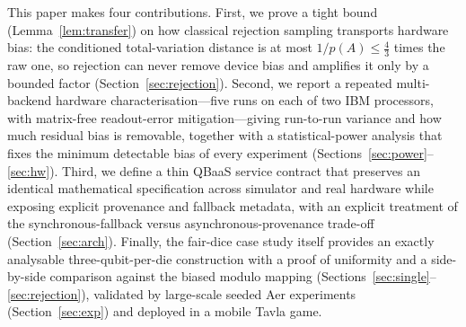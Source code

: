 \documentclass[journal]{IEEEtran}
\begin{document}
This paper makes four contributions. First, we prove a tight bound (Lemma~\ref{lem:transfer}) on how classical rejection sampling transports hardware bias: the conditioned total-variation distance is at most $1/p(A)\le\tfrac43$ times the raw one, so rejection can never remove device bias and amplifies it only by a bounded factor (Section~\ref{sec:rejection}). Second, we report a repeated multi-backend hardware characterisation---five runs on each of two IBM processors, with matrix-free readout-error mitigation---giving run-to-run variance and how much residual bias is removable, together with a statistical-power analysis that fixes the minimum detectable bias of every experiment (Sections~\ref{sec:power}--\ref{sec:hw}). Third, we define a thin QBaaS service contract that preserves an identical mathematical specification across simulator and real hardware while exposing explicit provenance and fallback metadata, with an explicit treatment of the synchronous-fallback versus asynchronous-provenance trade-off (Section~\ref{sec:arch}). Finally, the fair-dice case study itself provides an exactly analysable three-qubit-per-die construction with a proof of uniformity and a side-by-side comparison against the biased modulo mapping (Sections~\ref{sec:single}--\ref{sec:rejection}), validated by large-scale seeded Aer experiments (Section~\ref{sec:exp}) and deployed in a mobile Tavla game.
\end{document}
